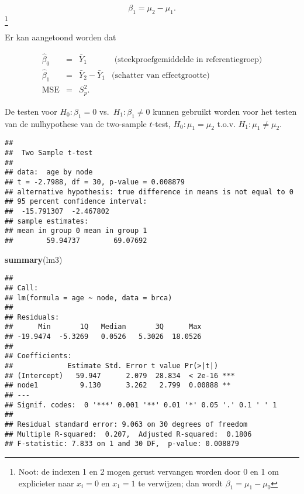 \documentclass[
  12pt,dutch,coursenotes]{book}
\newenvironment{Shaded}{\begin{snugshade}}{\end{snugshade}}
\newcommand{\DataTypeTok}[1]{\textcolor[rgb]{0.13,0.29,0.53}{#1}}
\newcommand{\KeywordTok}[1]{\textcolor[rgb]{0.13,0.29,0.53}{\textbf{#1}}}
\newcommand{\NormalTok}[1]{#1}
\newcommand{\OperatorTok}[1]{\textcolor[rgb]{0.81,0.36,0.00}{\textbf{#1}}}
\newcommand{\OtherTok}[1]{\textcolor[rgb]{0.56,0.35,0.01}{#1}}
\newcommand{\StringTok}[1]{\textcolor[rgb]{0.31,0.60,0.02}{#1}}
\theoremstyle{definition}
\theoremstyle{definition}
\theoremstyle{definition}
\theoremstyle{remark}
\begin{document}
\[\beta_1 = \mu_2-\mu_1.\]\footnote{Noot: de indexen 1 en 2 mogen gerust vervangen worden door 0 en 1 om explicieter naar \(x_i=0\) en \(x_1=1\) te verwijzen; dan wordt \(\beta_1=\mu_1-\mu_0\)}

Er kan aangetoond worden dat

\[\begin{array}{ccll}
 \hat\beta_0
   &=& \bar{Y}_1&\text{ (steekproefgemiddelde in referentiegroep)} \\
 \hat\beta_1
   &=& \bar{Y}_2-\bar{Y}_1&\text{(schatter van effectgrootte)} \\
 \text{MSE}
   &=& S_p^2 .
\end{array}\]

De testen voor \(H_0:\beta_1=0\) vs.~\(H_1:\beta_1\neq0\) kunnen gebruikt worden voor het testen van de nulhypothese van de two-sample \(t\)-test, \(H_0:\mu_1=\mu_2\) t.o.v. \(H_1:\mu_1\neq\mu_2\).

\begin{Shaded}
\end{Shaded}

\begin{verbatim}
## 
##  Two Sample t-test
## 
## data:  age by node
## t = -2.7988, df = 30, p-value = 0.008879
## alternative hypothesis: true difference in means is not equal to 0
## 95 percent confidence interval:
##  -15.791307  -2.467802
## sample estimates:
## mean in group 0 mean in group 1 
##        59.94737        69.07692
\end{verbatim}

\begin{Shaded}
\begin{Highlighting}[]
\KeywordTok{summary}\NormalTok{(lm3)}
\end{Highlighting}
\end{Shaded}

\begin{verbatim}
## 
## Call:
## lm(formula = age ~ node, data = brca)
## 
## Residuals:
##      Min       1Q   Median       3Q      Max 
## -19.9474  -5.3269   0.0526   5.3026  18.0526 
## 
## Coefficients:
##             Estimate Std. Error t value Pr(>|t|)    
## (Intercept)   59.947      2.079  28.834  < 2e-16 ***
## node1          9.130      3.262   2.799  0.00888 ** 
## ---
## Signif. codes:  0 '***' 0.001 '**' 0.01 '*' 0.05 '.' 0.1 ' ' 1
## 
## Residual standard error: 9.063 on 30 degrees of freedom
## Multiple R-squared:  0.207,  Adjusted R-squared:  0.1806 
## F-statistic: 7.833 on 1 and 30 DF,  p-value: 0.008879
\end{verbatim}
\end{document}
